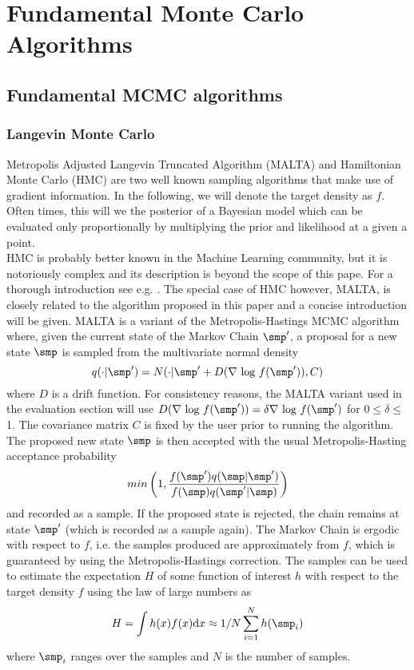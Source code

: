 \chapter{Fundamental Monte Carlo Algorithms}

\section{Fundamental MCMC algorithms}

\subsection{Langevin Monte Carlo}
\label{sec:lmc}
Metropolis Adjusted Langevin Truncated Algorithm (MALTA) \cite{Roberts1996} and Hamiltonian Monte Carlo (HMC) \cite{Neal2011} are two well known sampling algorithms that make use of gradient information. In the following, we will denote the target density as $f$. Often times, this will we the posterior of a Bayesian model which can be evaluated only proportionally by multiplying the prior and likelihood at a given a point. \\
 HMC is probably better known in the Machine Learning community, but it is notoriously complex and its description is beyond the scope of this pape. For a thorough introduction see e.g. \cite{Neal2011,Bishop2007}. The special case of HMC however, MALTA, is closely related to the algorithm proposed in this paper and a concise introduction will be given. MALTA is a variant of the Metropolis-Hastings MCMC algorithm where, given the current state of the Markov Chain $\smp'$, a proposal for a new state $\smp$ is sampled from the multivariate normal density
$$q(\cdot | \smp') = N(\cdot | \smp'  + D(\nabla~\textrm{log}~f(\smp' )), C)$$
where $D$ is a drift function. For consistency reasons, the MALTA variant 
used in the evaluation section will use $D(\nabla~\textrm{log}~f(\smp' )) = \delta\nabla~\textrm{log}~f(\smp')$ for $0 \leq \delta \leq$ 1. The covariance matrix $C$ is fixed by the user prior to running the algorithm.
The proposed new state $\smp$ is then accepted with the usual Metropolis-Hasting acceptance probability $$min\left(1,\frac{f(\smp')q(\smp | \smp')}{f(\smp)q(\smp' | \smp)}\right)$$ and recorded as a sample.
 If the proposed state is rejected, the chain remains at state $\smp'$ (which is recorded as a sample again). The Markov Chain is ergodic with respect to $f$, i.e. the samples produced are approximately from $f$, which is guaranteed by using the Metropolis-Hastings correction. The samples can be used to estimate the expectation $H$ of some function of interest $h$ with respect to the target density $f$ using the law of large numbers as
 $$H = \int h(x) f(x) \textrm{d}x \approx 1/N \sum_{i=1}^Nh(\smp_i)$$
where $\smp_i$ ranges over the samples and $N$ is the number of samples.


